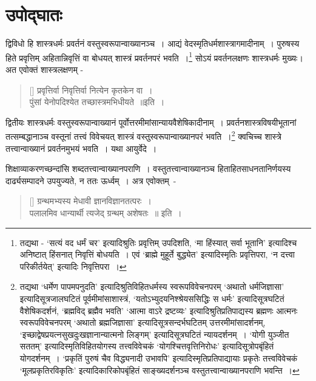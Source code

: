 \thispagestyle{empty}
\fontsize{14}{16}\selectfont
\section{उपोद्घातः}

	द्विविधो हि शास्त्रधर्मः प्रवर्तनं वस्तुस्वरूपान्वाख्यानञ्च~। आद्यं वेदस्मृतिधर्मशास्त्रागमादीनाम्~। पुरुषस्य हिते प्रवृत्तिम् अहितान्निवृत्तिं वा बोधयत् शास्त्रं प्रवर्तनपरं भवति~।\footnote{\small तद्यथा - ‘सत्यं वद धर्मं चर’ इत्यादिश्रुतिः प्रवृत्तिम् उपदिशति, ‘मा हिंस्यात् सर्वा भूतानि’ इत्यादिश्च  अनिष्टात् हिंसनात् निवृत्तिं बोधयति~। एवं ‘ब्राह्मे मुहूर्ते बुद्ध्येत’ इत्यादिस्मृतिः प्रवृत्तिपरा, ‘न दत्त्वा परिकीर्तयेत्’ इत्यादिः निवृत्तिपरा~।}  सोऽयं प्रवर्तनलक्षणः शास्त्रधर्मः मुख्यः। अत एवोक्तं शास्त्रलक्षणम् -

\begin{verse}[\versewidth]
		प्रवृत्तिर्वा निवृत्तिर्वा नित्येन कृतकेन वा~।\\[-6pt]
		पुंसां येनोपदिश्येत तच्छास्त्रमभिधीयते~॥इति~।
\end{verse}

	द्वितीयः शास्त्रधर्मः वस्तुस्वरूपान्वाख्यानं पूर्वोत्तरमीमांसान्यायवैशेषिकादीनाम्~। प्रवर्तनशास्त्रविषयीभूतानां तत्सम्बद्धानाञ्च वस्तूनां तत्त्वं विवेचयत्  शास्त्रं वस्तुस्वरूपान्वाख्यानपरं भवति~।\footnote{\small तद्यथा ‘धर्मेण पापमपनुदति’ इत्यादिश्रुतिविहितधर्मस्य स्वरूपविवेचनपरम् ‘अथातो धर्मजिज्ञासा’ इत्यादिसूत्रजालघटितं पूर्वमीमांसाशास्त्रं, ‘यतोऽभ्युदयनिश्श्रेयससिद्धिः स धर्मः’ इत्यादिसूत्रघटितं वैशेषिकदर्शनं, ‘ब्रह्मविद् ब्रह्मैव भवति’ ‘आत्मा वाऽरे द्रष्टव्यः’ इत्यादिश्रुतिप्रतिपाद्यस्य ब्रह्मणः आत्मनः स्वरूपविवेचनपरम् ‘अथातो ब्रह्मजिज्ञासा’ इत्यादिसूत्रसन्दर्भघटितम् उत्तरमीमांसादर्शनम्, ‘इच्छाद्वेषप्रयत्नसुखदुःखज्ञानान्यात्मनो लिङ्गम्’ इत्यादिसूत्रघटितं न्यायदर्शनम्~। ‘योगी युञ्जीत सततम्’ इत्यादिस्मृतिविहितयोगस्य तत्त्वविवेचकं ‘योगश्चित्तवृत्तिनिरोधः’ इत्यादिसूत्रोपबृंहितं योगदर्शनम्~। ‘प्रकृतिं पुरुषं चैव विद्ध्यनादी उभावपि’ इत्यादिस्मृतिप्रतिपाद्यायाः प्रकृतेः तत्त्वविवेचकं  ‘मूलप्रकृतिरविकृतिः’ इत्यादिकारिकोपबृंहितं साङ्ख्यदर्शनञ्च  वस्तुतत्त्वान्वाख्यानपराणि भवन्ति~।} क्वचिच्च शास्त्रे तत्त्वान्वाख्यानं प्रवर्तनमुभयं भवति~। यथा आयुर्वेदे~। 

	शिक्षाव्याकरणच्छन्दांसि शब्दतत्त्वान्वाख्यानपराणि~। वस्तुतत्त्वान्वाख्यानञ्च हिताहितसाधनतानिर्णयस्य दार्ढ्यसम्पादने उपयुज्यते, न ततः ऊर्ध्वम्~। अत्र एवोक्तम्~-
\begin{verse}[\versewidth]
		ग्रन्थमभ्यस्य मेधावी ज्ञानविज्ञानतत्परः~।\\[-6pt]
		पलालमिव धान्यार्थी त्यजेद् ग्रन्थम् अशेषतः~॥ इति~।
\end{verse}

